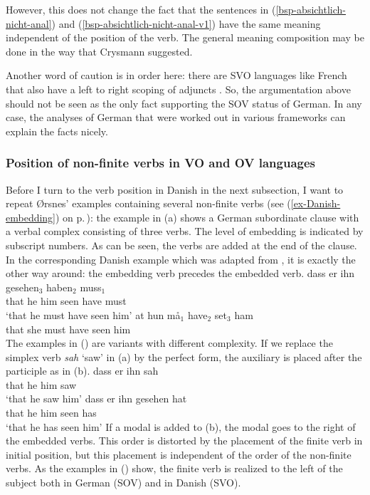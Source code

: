 However, this does not change the fact that the sentences in (\ref{bsp-absichtlich-nicht-anal}) and
(\ref{bsp-absichtlich-nicht-anal-v1}) have the same meaning independent of the position of the
verb. The general meaning composition may be done in the way that Crysmann suggested.%
%

Another word of caution is in order here: there are SVO languages like French that also have a left
to right scoping of adjuncts \citep[--161]{BGK2004a-u}. So, the argumentation above should not be seen as the only
fact supporting the SOV status of German. In any case, the analyses of German that were
worked out in various frameworks can explain the facts nicely.



\subsubsection{Position of non-finite verbs in VO and OV languages}

Before I turn to the verb position in Danish in the next subsection, I want to repeat Ørsnes'
examples containing several non-finite verbs (see (\ref{ex-Danish-embedding}) on p.\,\pageref{ex-Danish-embedding}): the example in (a) shows a German subordinate clause with a verbal complex consisting of
three verbs. The level of embedding is indicated by subscript numbers. As can be seen, the verbs are
added at the end of the clause. In the corresponding Danish example which was adapted from \citet[]{Oersnes2009b}, it is exactly the other way
around: the embedding verb precedes the embedded verb.
\eal
\ex
\gll dass er ihn gesehen$_3$ haben$_2$ muss$_1$\\
     that he him seen        have      must\\\german
\glt `that he must have seen him'
\ex
\gll at hun må$_1$ have$_2$ set$_3$ ham\\
     that she must have seen him\\\danish
\zl
%
The examples in () are variants with different complexity. If we replace the simplex verb
\emph{sah} `saw' in (a) by the perfect form, the auxiliary is placed after the participle as
in (b).
\eal
\ex
\gll dass er ihn sah\\
     that he him saw\\\german
\glt `that he saw him'
\ex
\gll dass er ihn gesehen hat\\
     that he him seen    has\\
\glt `that he has seen him'
\zl 
If a modal is added to (b), the modal goes to the right of the embedded verbs. This order is
distorted by the placement of the finite verb in initial position, but this placement is independent
of the order of the non-finite verbs. As the examples in () show, the finite verb is realized
to the left of the subject both in German (SOV) and in Danish (SVO).

